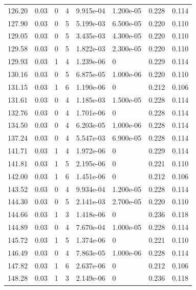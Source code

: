 \documentclass[preview]{standalone}
\begin{document}
{{{\begin{tabular}{L{1.2cm}C{1.2cm} C{0.3cm}C{0.5cm} C{1.4cm}C{1.4cm} C{1.4cm}C{1.4cm}}
  126.20  &  0.03  & 0     &  4 &  9.915e-04  & 1.200e-05  & 0.228 &  0.114   \\ 
  127.90  &  0.03  & 0     &  5 &  5.199e-03  & 6.500e-05  & 0.220 &  0.110   \\ 
  129.05  &  0.03  & 0     &  5 &  3.435e-03  & 4.300e-05  & 0.220 &  0.110   \\ 
  129.58  &  0.03  & 0     &  5 &  1.822e-03  & 2.300e-05  & 0.220 &  0.110   \\ 
  129.93  &  0.03  & 1     &  4 &  1.239e-06  & 0  & 0.229 &  0.114   \\ 
  130.16  &  0.03  & 0     &  5 &  6.875e-05  & 1.000e-06  & 0.220 &  0.110   \\ 
  131.15  &  0.03  & 1     &  6 &  1.190e-06  & 0  & 0.212 &  0.106   \\ 
  131.61  &  0.03  & 0     &  4 &  1.185e-03  & 1.500e-05  & 0.228 &  0.114   \\ 
  132.76  &  0.03  & 0     &  4 &  1.701e-06  & 0  & 0.228 &  0.114   \\ 
  134.50  &  0.03  & 0     &  4 &  6.203e-05  & 1.000e-06  & 0.228 &  0.114   \\ 
  137.24  &  0.03  & 0     &  4 &  5.547e-03  & 6.900e-05  & 0.228 &  0.114   \\ 
  141.71  &  0.03  & 1     &  4 &  1.972e-06  & 0  & 0.229 &  0.114   \\ 
  141.81  &  0.03  & 1     &  5 &  2.195e-06  & 0  & 0.221 &  0.110   \\ 
  142.00  &  0.03  & 1     &  6 &  1.451e-06  & 0  & 0.212 &  0.106   \\ 
  143.52  &  0.03  & 0     &  4 &  9.934e-04  & 1.200e-05  & 0.228 &  0.114   \\ 
  144.30  &  0.03  & 0     &  5 &  2.141e-03  & 2.700e-05  & 0.220 &  0.110   \\ 
  144.66  &  0.03  & 1     &  3 &  1.418e-06  & 0  & 0.236 &  0.118   \\ 
  144.89  &  0.03  & 0     &  4 &  7.670e-04  & 1.000e-05  & 0.228 &  0.114   \\ 
  145.72  &  0.03  & 1     &  5 &  1.374e-06  & 0  & 0.221 &  0.110   \\ 
  146.49  &  0.03  & 0     &  4 &  7.863e-05  & 1.000e-06  & 0.228 &  0.114   \\ 
  147.82  &  0.03  & 1     &  6 &  2.637e-06  & 0  & 0.212 &  0.106   \\ 
  148.28  &  0.03  & 1     &  3 &  2.149e-06  & 0  & 0.236 &  0.118   \\ 

\end{tabular}}}}
\end{document}
